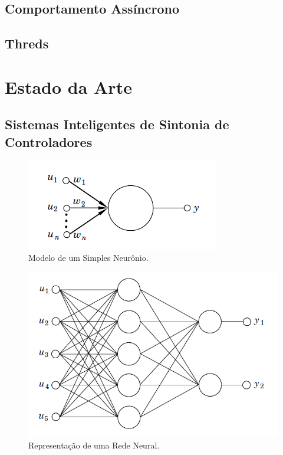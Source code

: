 \subsection{Comportamento Assíncrono}

\subsection{Threds}

\section{Estado da Arte}

\subsection{Sistemas Inteligentes de Sintonia de Controladores}

\begin{figure}[htb]
  \caption{Modelo de um Simples Neurônio.}
  \begin{center}
      \includegraphics[scale=0.6]{img/neuron_astrom_p295}
  \end{center}
  \label{fig:neuron_astrom_p295}
\end{figure}

\begin{figure}[htb]
  \caption{Representação de uma Rede Neural.}
  \begin{center}
      \includegraphics[scale=0.65]{img/feedforward_neural_astrom_p297}
  \end{center}
  \label{fig:feedforward_neural_astrom_p297}
\end{figure}

